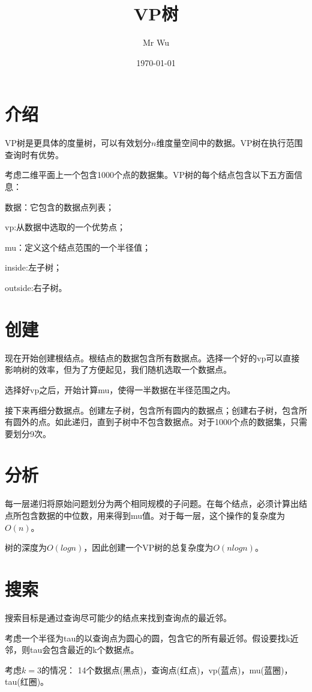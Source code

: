 \documentclass{ctexart}
\title{VP树}
\author{Mr Wu}
\date{\today}
\begin{document}
	\maketitle
	\section{介绍}
	VP树是更具体的度量树，可以有效划分$ n $维度量空间中的数据。VP树在执行范围查询时有优势。
	
	考虑二维平面上一个包含1000个点的数据集。VP树的每个结点包含以下五方面信息：
	
	数据：它包含的数据点列表；
	
	vp:从数据中选取的一个优势点；
	
	mu：定义这个结点范围的一个半径值；
	
	inside:左子树；
	
	outside:右子树。
	
	\section{创建}
	现在开始创建根结点。根结点的数据包含所有数据点。选择一个好的vp可以直接影响树的效率，但为了方便起见，我们随机选取一个数据点。
	
	选择好vp之后，开始计算mu，使得一半数据在半径范围之内。
	
	接下来再细分数据点。创建左子树，包含所有圆内的数据点；创建右子树，包含所有圆外的点。如此递归，直到子树中不包含数据点。对于1000个点的数据集，只需要划分9次。
	
	\section{分析}
	每一层递归将原始问题划分为两个相同规模的子问题。在每个结点，必须计算出结点所包含数据的中位数，用来得到mu值。对于每一层，这个操作的复杂度为$ O(n) $。
	
	树的深度为$ O(logn) $，因此创建一个VP树的总复杂度为$ O(nlogn) $。
	
	\section{搜索}
	搜索目标是通过查询尽可能少的结点来找到查询点的最近邻。
	
	考虑一个半径为tau的以查询点为圆心的圆，包含它的所有最近邻。假设要找k近邻，则tau会包含最近的k个数据点。
	
	考虑$ k=3 $的情况：
	14个数据点(黑点)，查询点(红点)，vp(蓝点)，mu(蓝圈)，tau(红圈)。
	
\end{document}
